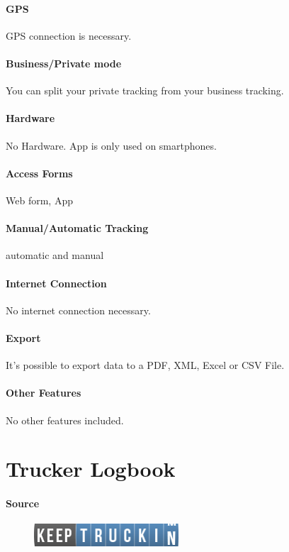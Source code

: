 \paragraph{GPS} GPS connection is necessary.
\paragraph{Business/Private mode} You can split your private tracking from your business tracking.
\paragraph{Hardware} No Hardware. App is only used on smartphones.
\paragraph{Access Forms} Web form, App
\paragraph{Manual/Automatic Tracking} automatic and manual
\paragraph{Internet Connection} No internet connection necessary.
\paragraph{Export} It’s possible to export data to a PDF, XML, Excel or CSV File.
\paragraph{Other Features} No other features included.
\newpage

\section{Trucker Logbook}
\paragraph{Source} 
\begin{figure}
  \begin{center}
    \includegraphics[width=0.48\textwidth]{trucker}
  \end{center}
\end{figure}
